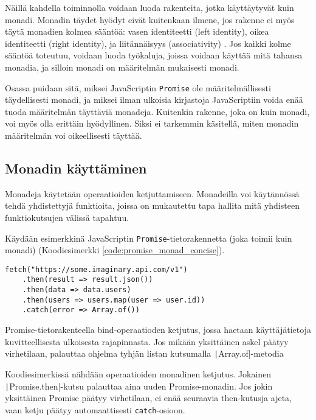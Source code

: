 Näillä kahdella toiminnolla voidaan luoda rakenteita, jotka käyttäytyvät kuin monadi. Monadin täydet hyödyt eivät kuitenkaan ilmene, jos rakenne ei myös täytä monadien kolmea sääntöä: vasen identiteetti (left identity), oikea identiteetti (right identity), ja liitännäisyys (associativity) \cite{haskellmonadlaws}. Jos kaikki kolme sääntöä toteutuu, voidaan luoda työkaluja, joissa voidaan käyttää mitä tahansa monadia, ja silloin monadi on määritelmän mukaisesti monadi.

Osassa  puidaan sitä, miksei JavaScriptin \texttt{Promise} ole määritelmällisesti täydellisesti monadi, ja miksei ilman ulkoisia kirjastoja JavaScriptiin voida enää tuoda määritelmän täyttäviä monadeja. Kuitenkin rakenne, joka on kuin monadi, voi myös olla erittäin hyödyllinen. Siksi ei tarkemmin käsitellä, miten monadin määritelmän voi oikeellisesti täyttää.


\subsection{Monadin käyttäminen}

Monadeja käytetään operaatioiden ketjuttamiseen. Monadeilla voi käytännössä tehdä yhdistettyjä funktioita, joissa on mukautettu tapa hallita mitä yhdisteen funktiokutsujen välissä tapahtuu.

Käydään esimerkkinä JavaScriptin \texttt{Promise}-tietorakennetta (joka toimii kuin monadi) (Koodiesimerkki \ref{code:promise_monad_concise}).

\begin{code}
    \begin{verbatim}
fetch("https://some.imaginary.api.com/v1") 
    .then(result => result.json()) 
    .then(data => data.users)
    .then(users => users.map(user => user.id))
    .catch(error => Array.of()) 
    \end{verbatim}
    \caption{Promise-tietorakenteella bind-operaatioden ketjutus, jossa haetaan käyttäjätietoja kuvitteellisesta ulkoisesta rajapinnasta. Jos mikään yksittäinen askel päätyy virhetilaan, palauttaa ohjelma tyhjän listan kutsumalla \texttt|Array.of|-metodia}
    \label{code:promise_monad_concise}
\end{code}

Koodiesimerkissä nähdään operaatioiden monadinen ketjutus. Jokainen \texttt|Promise.then|-kutsu palauttaa aina uuden Promise-monadin. Jos jokin yksittäinen Promise päätyy virhetilaan, ei enää seuraavia then-kutusja ajeta, vaan ketju päätyy automaattisesti \texttt{catch}-osioon.

